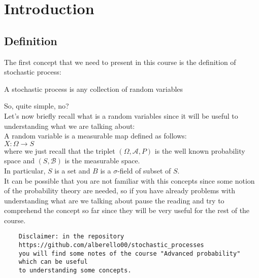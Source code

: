 \chapter{Introduction}
\vspace*{0.5cm}
\setcounter{page}{1}


\section{Definition}
The first concept that we need to present in this course is the definition of stochastic process:
    \begin{definition} 
     A stochastic process is any collection of random variables 
    \end{definition}    
So, quite simple, no? \\
Let's now briefly recall what is a random variables since it will be useful to understanding what we are talking about: \\

A random variable is a measurable map defined as follows:\\
$X: \Omega \longrightarrow S$ \\
where we just recall that the triplet $(\Omega, \mathcal{A}, P)$ is the well known probability space and $(S, \mathcal{B})$ is the measurable space.\\
In particular, $S$ is a set and $B$ is a $\sigma$-field of subset of $S$.
\\
It can be possible that you are not familiar with this concepts since some notion of the probability theory are needed, so if you have already problems with understanding what are we talking about pause the reading and try to comprehend the concept so far since they will be very useful for the rest of the course.
\\
\begin{verbatim}
    Disclaimer: in the repository 
    https://github.com/alberello00/stochastic_processes
    you will find some notes of the course "Advanced probability" 
    which can be useful 
    to understanding some concepts.
\end{verbatim}

